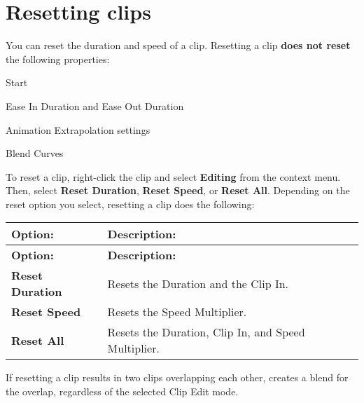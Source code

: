 \chapter{Resetting clips}
\hypertarget{md__library_2_package_cache_2com_8unity_8timeline_0d1_87_86_2_documentation_0i_2clp__reset}{}\label{md__library_2_package_cache_2com_8unity_8timeline_0d1_87_86_2_documentation_0i_2clp__reset}
\label{md__library_2_package_cache_2com_8unity_8timeline_0d1_87_86_2_documentation_0i_2clp__reset_autotoc_md1124}%
%
 You can reset the duration and speed of a clip. Resetting a clip {\bfseries{does not reset}} the following properties\+:


\begin{DoxyItemize}
\item Start
\item Ease In Duration and Ease Out Duration
\item Animation Extrapolation settings
\item Blend Curves
\end{DoxyItemize}

To reset a clip, right-\/click the clip and select {\bfseries{Editing}} from the context menu. Then, select {\bfseries{Reset Duration}}, {\bfseries{Reset Speed}}, or {\bfseries{Reset All}}. Depending on the reset option you select, resetting a clip does the following\+:

\tabulinesep=1mm
\begin{longtabu}spread 0pt [c]{*{2}{|X[-1]}|}
\hline
\cellcolor{\tableheadbgcolor}\textbf{ {\bfseries{Option\+:}}   }&\cellcolor{\tableheadbgcolor}\textbf{ {\bfseries{Description\+:}}    }\\
\endfirsthead
\hline
\endfoot
\hline
\cellcolor{\tableheadbgcolor}\textbf{ {\bfseries{Option\+:}}   }&\cellcolor{\tableheadbgcolor}\textbf{ {\bfseries{Description\+:}}    }\\
\endhead
{\bfseries{Reset Duration}}   &Resets the Duration and the Clip In.    \\
{\bfseries{Reset Speed}}   &Resets the Speed Multiplier.    \\
{\bfseries{Reset All}}   &Resets the Duration, Clip In, and Speed Multiplier.   \\
\end{longtabu}


If resetting a clip results in two clips overlapping each other,  creates a blend for the overlap, regardless of the selected Clip Edit mode. 